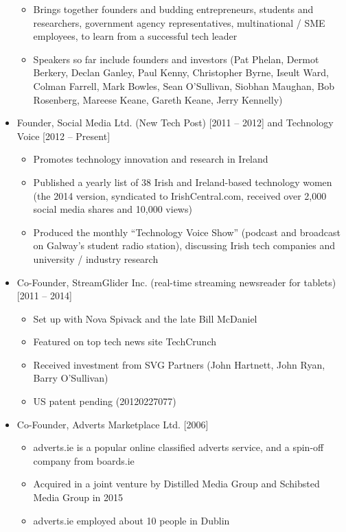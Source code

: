 \documentclass[10pt,a4paper]{res} %
\begin{document}
\begin{resume}
\begin{itemize}
\begin{itemize}
\item Brings together founders and budding entrepreneurs, students and researchers, government agency representatives, multinational / SME employees, to learn from a successful tech leader
\item Speakers so far include founders and investors (Pat Phelan, Dermot Berkery, Declan Ganley, Paul Kenny, Christopher Byrne, Iseult Ward, Colman Farrell, Mark Bowles, Sean O'Sullivan, Siobhan Maughan, Bob Rosenberg, Mareese Keane, Gareth Keane, Jerry Kennelly)
\end{itemize}
\item Founder, Social Media Ltd. (New Tech Post) [2011 -- 2012] and Technology Voice [2012 -- Present]
\begin{itemize} \itemsep -2pt
\item Promotes technology innovation and research in Ireland
\item Published a yearly list of 38 Irish and Ireland-based technology women (the 2014 version, syndicated to IrishCentral.com, received over 2,000 social media shares and 10,000 views)
\item Produced the monthly ``Technology Voice Show'' (podcast and broadcast on Galway's student radio station), discussing Irish tech companies and university / industry research
\end{itemize}
\item Co-Founder, StreamGlider Inc. (real-time streaming newsreader for tablets) [2011 -- 2014]
\begin{itemize} \itemsep -2pt
\item Set up with Nova Spivack and the late Bill McDaniel
\item Featured on top tech news site TechCrunch
\item Received investment from SVG Partners (John Hartnett, John Ryan, Barry O'Sullivan)
\item US patent pending (20120227077)
\end{itemize}
\item Co-Founder, Adverts Marketplace Ltd. [2006]
\begin{itemize} \itemsep -2pt
\item adverts.ie is a popular online classified adverts service, and a spin-off company from boards.ie
\item Acquired in a joint venture by Distilled Media Group and Schibsted Media Group in 2015
\item adverts.ie employed about 10 people in Dublin
\end{itemize}

\end{itemize}
\end{resume}
\end{document}
